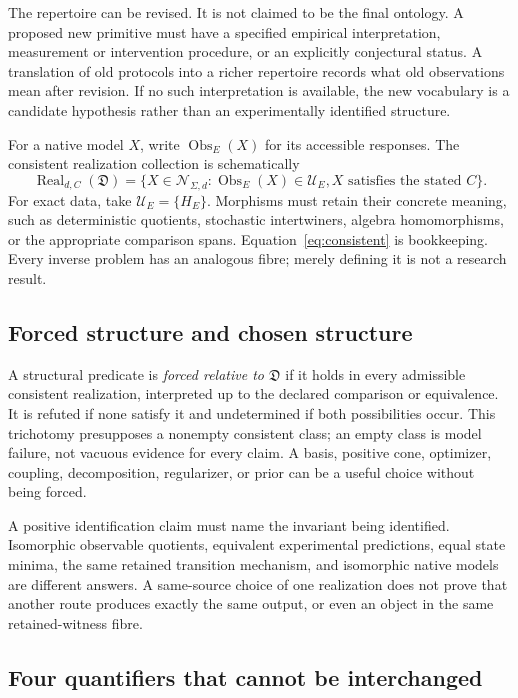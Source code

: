 \documentclass[11pt]{article}
\theoremstyle{remark}
\newcommand{\Obs}{\operatorname{Obs}}
\newcommand{\Real}{\operatorname{Real}}
\newcommand{\calN}{\mathcal N}
\newcommand{\calU}{\mathcal U}
\begin{document}
The repertoire can be revised. It is not claimed to be the final ontology. A proposed new primitive must have a specified empirical interpretation, measurement or intervention procedure, or an explicitly conjectural status. A translation of old protocols into a richer repertoire records what old observations mean after revision. If no such interpretation is available, the new vocabulary is a candidate hypothesis rather than an experimentally identified structure.

For a native model $X$, write $\Obs_E(X)$ for its accessible responses. The consistent realization collection is schematically
\begin{equation}
 \Real_{d,C}(\mathfrak D)
 =\{X\in\calN_{\Sigma,d}:\Obs_E(X)\in\calU_E, X\text{ satisfies the stated }C\}.
 \label{eq:consistent}
\end{equation}
For exact data, take $\calU_E=\{H_E\}$. Morphisms must retain their concrete meaning, such as deterministic quotients, stochastic intertwiners, algebra homomorphisms, or the appropriate comparison spans. Equation~\eqref{eq:consistent} is bookkeeping. Every inverse problem has an analogous fibre; merely defining it is not a research result.

\subsection{Forced structure and chosen structure}

A structural predicate is \emph{forced relative to $\mathfrak D$} if it holds in every admissible consistent realization, interpreted up to the declared comparison or equivalence. It is refuted if none satisfy it and undetermined if both possibilities occur. This trichotomy presupposes a nonempty consistent class; an empty class is model failure, not vacuous evidence for every claim. A basis, positive cone, optimizer, coupling, decomposition, regularizer, or prior can be a useful choice without being forced.

A positive identification claim must name the invariant being identified. Isomorphic observable quotients, equivalent experimental predictions, equal state minima, the same retained transition mechanism, and isomorphic native models are different answers. A same-source choice of one realization does not prove that another route produces exactly the same output, or even an object in the same retained-witness fibre.

\subsection{Four quantifiers that cannot be interchanged}
\end{document}
